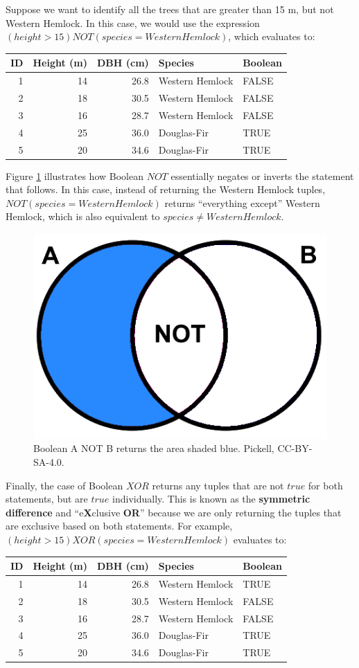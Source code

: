 \documentclass[
]{book}
\begin{document}
Suppose we want to identify all the trees that are greater than 15 m, but not Western Hemlock. In this case, we would use the expression \((height>15)NOT(species=WesternHemlock)\), which evaluates to:

\begin{tabular}{rrrll}
\toprule
ID & Height (m) & DBH (cm) & Species & Boolean\\
\midrule
1 & 14 & 26.8 & Western Hemlock & FALSE\\
2 & 18 & 30.5 & Western Hemlock & FALSE\\
3 & 16 & 28.7 & Western Hemlock & FALSE\\
4 & 25 & 36.0 & Douglas-Fir & TRUE\\
5 & 20 & 34.6 & Douglas-Fir & TRUE\\
\bottomrule
\end{tabular}

Figure \ref{fig:5-boolean-not} illustrates how Boolean \(NOT\) essentially negates or inverts the statement that follows. In this case, instead of returning the Western Hemlock tuples, \(NOT(species=WesternHemlock)\) returns ``everything except'' Western Hemlock, which is also equivalent to \(species≠WesternHemlock\).

\begin{figure}
\includegraphics[width=0.5\linewidth]{images/05-boolean-not} \caption{Boolean A NOT B returns the area shaded blue. Pickell, CC-BY-SA-4.0.}\label{fig:5-boolean-not}
\end{figure}

Finally, the case of Boolean \(XOR\) returns any tuples that are not \(true\) for both statements, but are \(true\) individually. This is known as the \textbf{symmetric difference} and ``e\textbf{X}clusive \textbf{OR}'' because we are only returning the tuples that are exclusive based on both statements. For example, \((height>15)XOR(species=WesternHemlock)\) evaluates to:

\begin{tabular}{rrrll}
\toprule
ID & Height (m) & DBH (cm) & Species & Boolean\\
\midrule
1 & 14 & 26.8 & Western Hemlock & TRUE\\
2 & 18 & 30.5 & Western Hemlock & FALSE\\
3 & 16 & 28.7 & Western Hemlock & FALSE\\
4 & 25 & 36.0 & Douglas-Fir & TRUE\\
5 & 20 & 34.6 & Douglas-Fir & TRUE\\
\bottomrule
\end{tabular}
\end{document}
